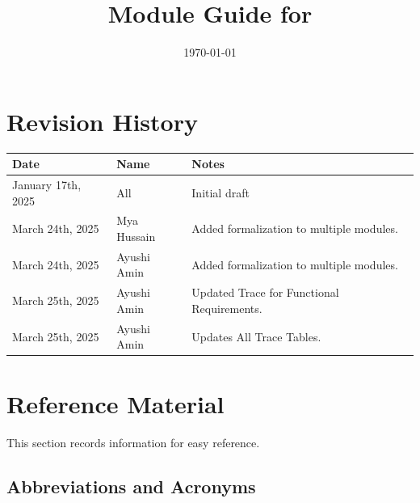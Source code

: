 \documentclass[12pt, titlepage]{article}
\begin{document}
\title{Module Guide for \progname{}} 
\author{\authname}
\date{\today}

\maketitle


\section{Revision History}

\begin{tabularx}{\textwidth}{p{3cm}p{2cm}X}
\toprule {\bf Date} & {\bf Name} & {\bf Notes}\\
\midrule
January 17th, 2025 & All & Initial draft\\
March 24th, 2025 & Mya Hussain & Added formalization to multiple modules. \\
March 24th, 2025 & Ayushi Amin & Added formalization to multiple modules. \\
March 25th, 2025 & Ayushi Amin & Updated Trace for Functional Requirements. \\
March 25th, 2025 & Ayushi Amin & Updates All Trace Tables. \\
\bottomrule
\end{tabularx}

\newpage

\section{Reference Material}

This section records information for easy reference.

\subsection{Abbreviations and Acronyms}
\end{document}
